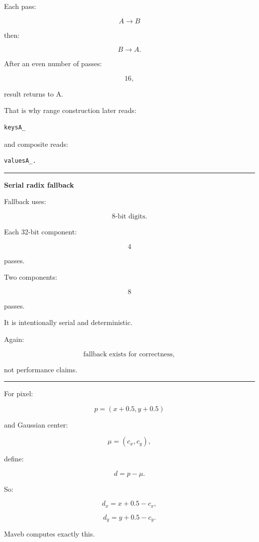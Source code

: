 Each pass:

\[
A\rightarrow B
\]

then:

\[
B\rightarrow A.
\]

After an even number of passes:

\[
16,
\]

result returns to A.

That is why range construction later reads:

\begin{verbatim}
keysA_
\end{verbatim}

and composite reads:

\begin{verbatim}
valuesA_.
\end{verbatim}

\begin{center}\rule{0.5\linewidth}{0.5pt}\end{center}

\textbf{Serial radix fallback}

Fallback uses:

\[
8\text{-bit digits}.
\]

Each 32-bit component:

\[
4
\]

passes.

Two components:

\[
8
\]

passes.

It is intentionally serial and deterministic.

Again:

\[
\text{fallback exists for correctness},
\]

not performance claims.

\begin{center}\rule{0.5\linewidth}{0.5pt}\end{center}

For pixel:

\[
p=
(x+0.5,y+0.5)
\]

and Gaussian center:

\[
\mu=(c_x,c_y),
\]

define:

\[
\boxed{
d=
p-\mu.
}
\]

So:

\[
d_x=
x+0.5-c_x,
\]

\[
d_y=
y+0.5-c_y.
\]

Maveb computes exactly this.

